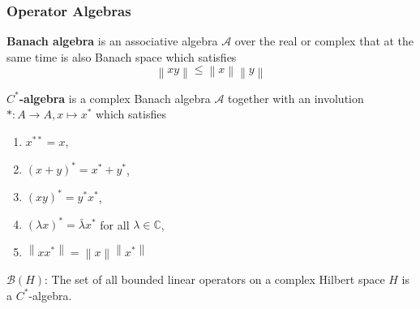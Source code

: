 \documentclass{beamer}
\begin{document}
\begin{frame}
    \frametitle{Operator Algebras}
        \textbf{Banach algebra} is an associative algebra \(\mathcal{A}\) over the real or complex that at the same time is also Banach space which satisfies
        \[\left \lVert xy \right \rVert \le \left \lVert x \right \rVert \left \lVert y \right \rVert\]\pause
        
        \textbf{\(C^\ast\)-algebra} is a complex Banach algebra \(\mathcal{A}\) together with an involution \(\ast:A \to A, x \mapsto x^\ast\) which satisfies\pause
            \begin{enumerate}
                \item \(x^{\ast\ast}=x\),\pause
                \item \((x+y)^\ast=x^\ast+y^\ast\),\pause
                \item \((xy)^\ast = y^\ast x^\ast\),\pause
                \item \((\lambda x)^\ast=\bar{\lambda}x^\ast\) for all \(\lambda \in \mathbb{C}\),\pause
                \item \(\left \lVert xx^\ast \right \rVert = \left \lVert x \right \rVert \left \lVert x^\ast \right \rVert \)
            \end{enumerate}\pause
        \begin{example}
            \(\mathcal{B}(H)\): The set of all bounded linear operators on a complex Hilbert space \(H\) is a \(C^\ast\)-algebra.
        \end{example}
    \end{frame}
\end{document}
